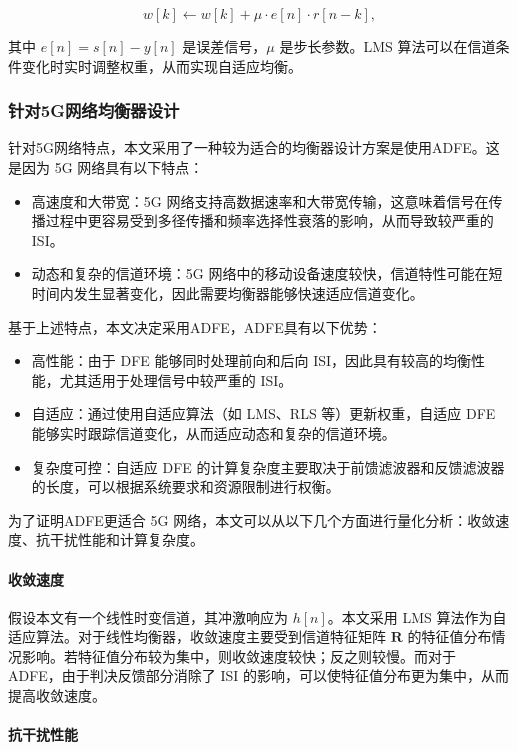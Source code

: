\documentclass[UTF8,a4paper,12pt]{ctexart}
\numberwithin{equation}{section}
\begin{document}
	\begin{equation}
		w[k] \leftarrow w[k] + \mu \cdot e[n] \cdot r[n-k],
	\end{equation}
	
	其中 $e[n] = s[n] - y[n]$ 是误差信号，$\mu$ 是步长参数。LMS 算法可以在信道条件变化时实时调整权重，从而实现自适应均衡。
	
	\subsubsection{针对5G网络均衡器设计}针对5G网络特点，本文采用了一种较为适合的均衡器设计方案是使用ADFE。这是因为 5G 网络具有以下特点：
	\begin{itemize}
		\item 高速度和大带宽：5G 网络支持高数据速率和大带宽传输，这意味着信号在传播过程中更容易受到多径传播和频率选择性衰落的影响，从而导致较严重的ISI。
		\item 动态和复杂的信道环境：5G 网络中的移动设备速度较快，信道特性可能在短时间内发生显著变化，因此需要均衡器能够快速适应信道变化。
	\end{itemize}
	基于上述特点，本文决定采用ADFE，ADFE具有以下优势：
	\begin{itemize}
		\item 高性能：由于 DFE 能够同时处理前向和后向 ISI，因此具有较高的均衡性能，尤其适用于处理信号中较严重的 ISI。
		\item 自适应：通过使用自适应算法（如 LMS、RLS 等）更新权重，自适应 DFE 能够实时跟踪信道变化，从而适应动态和复杂的信道环境。
		\item 复杂度可控：自适应 DFE 的计算复杂度主要取决于前馈滤波器和反馈滤波器的长度，可以根据系统要求和资源限制进行权衡。
	\end{itemize}
	为了证明ADFE更适合 5G 网络，本文可以从以下几个方面进行量化分析：收敛速度、抗干扰性能和计算复杂度。
	
	\paragraph{收敛速度}
	假设本文有一个线性时变信道，其冲激响应为 $h[n]$。本文采用 LMS 算法作为自适应算法。对于线性均衡器，收敛速度主要受到信道特征矩阵 $\mathbf{R}$ 的特征值分布情况影响。若特征值分布较为集中，则收敛速度较快；反之则较慢。而对于 ADFE，由于判决反馈部分消除了 ISI 的影响，可以使特征值分布更为集中，从而提高收敛速度。
	
	\paragraph{抗干扰性能}
	
\end{document}
